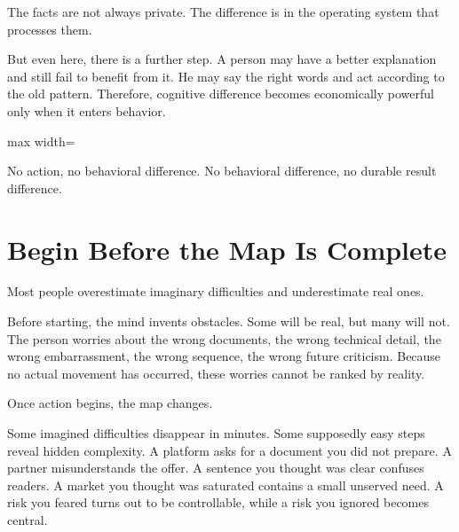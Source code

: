 The facts are not always private. The difference is in the operating system that processes them.

But even here, there is a further step. A person may have a better explanation and still fail to benefit from it. He may say the right words and act according to the old pattern. Therefore, cognitive difference becomes economically powerful only when it enters behavior.

\begin{center}
\begin{adjustbox}{max width=\linewidth}
\end{adjustbox}
\end{center}

No action, no behavioral difference. No behavioral difference, no durable result difference.

\section*{Begin Before the Map Is Complete}

Most people overestimate imaginary difficulties and underestimate real ones.

Before starting, the mind invents obstacles. Some will be real, but many will not. The person worries about the wrong documents, the wrong technical detail, the wrong embarrassment, the wrong sequence, the wrong future criticism. Because no actual movement has occurred, these worries cannot be ranked by reality.

Once action begins, the map changes.

Some imagined difficulties disappear in minutes. Some supposedly easy steps reveal hidden complexity. A platform asks for a document you did not prepare. A partner misunderstands the offer. A sentence you thought was clear confuses readers. A market you thought was saturated contains a small unserved need. A risk you feared turns out to be controllable, while a risk you ignored becomes central.

